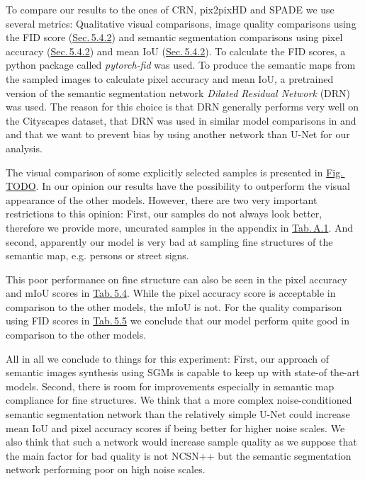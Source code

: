 To compare our results to the ones of CRN, pix2pixHD and SPADE we use several metrics: Qualitative visual comparisons, image quality comparisons using the FID score (\hyperref[sec:fid]{Sec.\,5.4.2}) and semantic segmentation comparisons using pixel accuracy (\hyperref[sec:acc]{Sec.\,5.4.2}) and mean IoU (\hyperref[sec:fid]{Sec.\,5.4.2}). To calculate the FID scores, a python package called \textit{pytorch-fid} \cite{fid_pytorch} was used. To produce the semantic maps from the sampled images to calculate pixel accuracy and mean IoU, a pretrained version of the semantic segmentation network \textit{Dilated Residual Network} (DRN) \cite{drn} was used. The reason for this choice is that DRN generally performs very well on the Cityscapes dataset, that DRN was used in similar model comparisons in \cite{pix2pix} and \cite{spade} and that we want to prevent bias by using another network than U-Net for our analysis.
 
The visual comparison of some explicitly selected samples is presented in \hyperref[fig:]{Fig.\,TODO}. In our opinion our results have the possibility to outperform the visual appearance of the other models. However, there are two very important restrictions to this opinion: First, our samples do not always look better, therefore we provide more, uncurated samples in the appendix in \hyperref[tab:a1]{Tab.\,A.1}. And second, apparently our model is very bad at sampling fine structures of the semantic map, e.g. persons or street signs. 

This poor performance on fine structure can also be seen in the pixel accuracy and mIoU scores in \hyperref[tab:5.4]{Tab.\,5.4}. While the pixel accuracy score is acceptable in comparison to the other models, the mIoU is not. For the quality comparison using FID scores in \hyperref[tab:5.5]{Tab.\,5.5} we conclude that our model perform quite good in comparison to the other models.

All in all we conclude to things for this experiment: First, our approach of semantic images synthesis using SGMs is capable to keep up with state-of the-art models. Second, there is room for improvements especially in semantic map compliance for fine structures. We think that a more complex noise-conditioned semantic segmentation network than the relatively simple U-Net could increase mean IoU and pixel accuracy scores if being better for higher noise scales. We also think that such a network would increase sample quality as we suppose that the main factor for bad quality is not NCSN++ but the semantic segmentation network performing poor on high noise scales.

